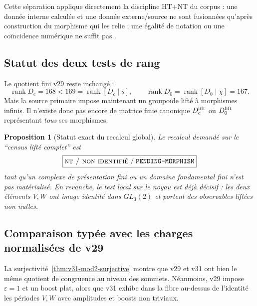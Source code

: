 \documentclass[11pt,a4paper]{article}
\newtheorem{proposition}[theorem]{Proposition}
\newcommand{\rank}{\operatorname{rank}}
\newcommand{\statusNT}{\textsc{nt / non identifié}}
\newcommand{\certPending}{\texttt{PENDING-MORPHISM}}
\begin{document}
Cette séparation applique directement la discipline HT+NT du corpus : une donnée interne
calculée et une donnée externe/source ne sont fusionnées qu'après construction du morphisme qui
les relie ; une égalité de notation ou une coïncidence numérique ne suffit pas
\cite{SellingHTNT,Quarter22,Reversal}.

\subsection{Statut des deux tests de rang}

Le quotient fini v29 reste inchangé :
\begin{equation}\label{eq:v31-v29-ranks}
 \rank D_c=168<169=\rank[D_c\mid s],
 \qquad
 \rank D_0=\rank[D_0\mid\chi]=167.
\end{equation}
Mais la source primaire impose maintenant un groupoïde lifté à morphismes infinis. Il n'existe
donc pas encore de matrice finie canonique $D_c^{\rm lift}$ ou $D_0^{\rm lift}$ représentant
\emph{tous} ses morphismes.

\begin{proposition}[Statut exact du recalcul global]\label{prop:v31-rank-status}
Le recalcul demandé sur le ``census lifté complet'' est
\[
 \boxed{\statusNT{}\;/\;\certPending{}}
\]
tant qu'un complexe de présentation fini ou un domaine fondamental fini n'est pas matérialisé.
En revanche, le test local sur le noyau est déjà décisif : les deux éléments $V,W$ ont image
identité dans $GL_3(2)$ et portent des observables liftées non nulles.
\end{proposition}

\subsection{Comparaison typée avec les charges normalisées de v29}

La surjectivité~\ref{thm:v31-mod2-surjective} montre que v29 et v31 ont bien le même quotient de
congruence au niveau des sommets. Néanmoins, v29 impose $\varepsilon=1$ et un boost plat, alors
que v31 exhibe dans la fibre au-dessus de l'identité les périodes $V,W$ avec amplitudes et boosts
non triviaux.
\end{document}
